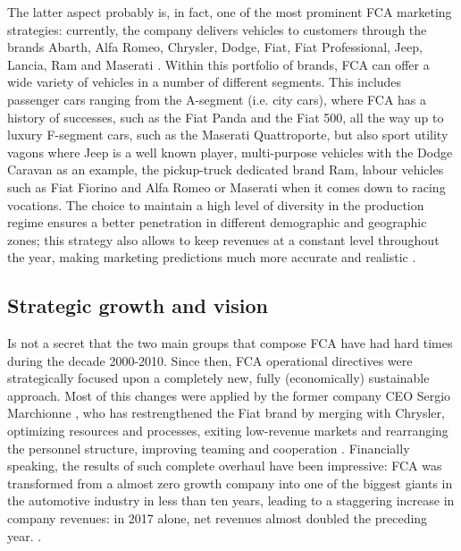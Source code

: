 The latter aspect probably is, in fact, one of the most prominent FCA marketing strategies: currently, the company delivers vehicles to customers through the brands Abarth, Alfa Romeo, Chrysler, Dodge, Fiat, Fiat Professional, Jeep, Lancia, Ram and Maserati \cite{fca_overview}. Within this portfolio of brands, FCA can offer a wide variety of vehicles in a number of different segments. This includes passenger cars ranging from the A-segment (i.e. city cars), where FCA has a history of successes, such as the Fiat Panda and the Fiat 500, all the way up to luxury F-segment cars, such as the Maserati Quattroporte, but also sport utility vagons where Jeep is a well known player, multi-purpose vehicles with the Dodge Caravan as an example, the pickup-truck dedicated brand Ram, labour vehicles such as Fiat Fiorino and Alfa Romeo or Maserati when it comes down to racing vocations.
The choice to maintain a high level of diversity in the production regime ensures a better penetration in different demographic and geographic zones; this strategy also allows to keep revenues at a constant level throughout the year, making marketing predictions much more accurate and realistic \cite{fca_marketing_strategy}.


\subsection{Strategic growth and vision}
Is not a secret that the two main groups that compose FCA have had hard times during the decade 2000-2010.
Since then, FCA operational directives were strategically focused upon a completely new, fully (economically) sustainable approach. Most of this changes were applied by the former company CEO Sergio Marchionne \cite{fca_marchionne_fortune}, who has restrengthened the Fiat brand by merging with Chrysler, optimizing resources and processes, exiting low-revenue markets and rearranging the personnel structure, improving teaming and cooperation \cite{fca_marketing_strategy}. Financially speaking, the results of such complete overhaul have been impressive: FCA was transformed from a almost zero growth company into one of the biggest giants in the automotive industry in less than ten years, leading to a staggering increase in company revenues: in 2017 alone, net revenues almost doubled the preceding year. \cite{fca_marchionne_fortune}\cite{statista_fca_net_revenues}.

